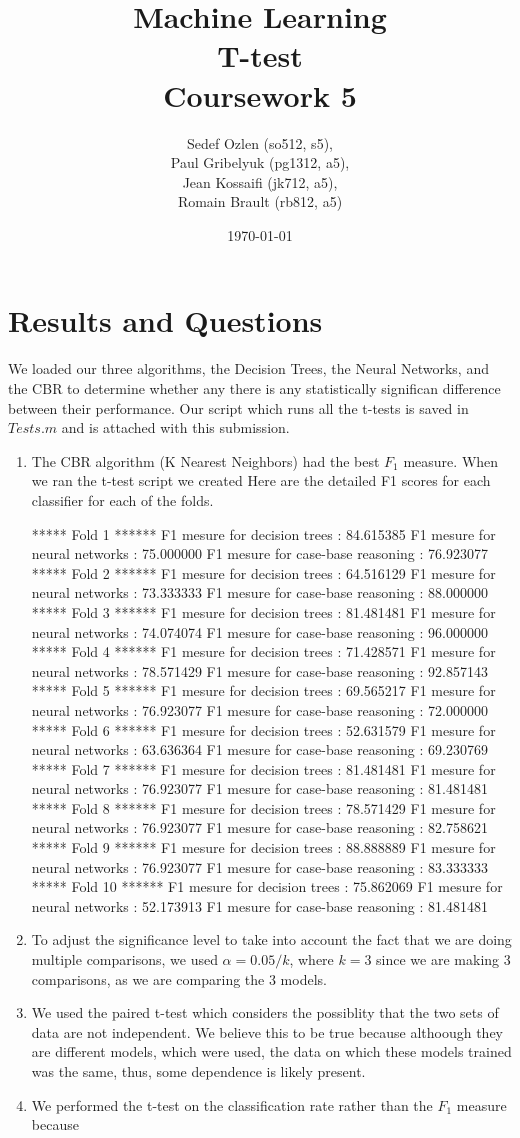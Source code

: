 \documentclass[a4paper,12pt,oneside,final]{report}
\author{
    Sedef Ozlen (so512, s5), \\ 
    Paul Gribelyuk (pg1312, a5), \\
    Jean Kossaifi (jk712, a5), \\ 
    Romain Brault (rb812, a5)
}
\title{\Huge Machine Learning \\ T-test \\ Coursework 5}
\date{\today}
\begin{document}
\maketitle
\tableofcontents
\listoffigures


\chapter{Results and Questions}
We loaded our three algorithms, the Decision Trees, the Neural Networks, and the CBR to determine whether any there is any statistically significan difference between their performance.  Our script which runs all the t-tests is saved in $Tests.m$ and is attached with this submission.
\begin{enumerate}
\item The CBR algorithm (K Nearest Neighbors) had the best $F_1$ measure.  When we ran the t-test script we created
Here are the detailed F1 scores for each classifier for each of the folds.

***** Fold 1 ******
F1 mesure for decision trees : 84.615385
F1 mesure for neural networks : 75.000000
F1 mesure for case-base reasoning : 76.923077
***** Fold 2 ******
F1 mesure for decision trees : 64.516129
F1 mesure for neural networks : 73.333333
F1 mesure for case-base reasoning : 88.000000
***** Fold 3 ******
F1 mesure for decision trees : 81.481481
F1 mesure for neural networks : 74.074074
F1 mesure for case-base reasoning : 96.000000
***** Fold 4 ******
F1 mesure for decision trees : 71.428571
F1 mesure for neural networks : 78.571429
F1 mesure for case-base reasoning : 92.857143
***** Fold 5 ******
F1 mesure for decision trees : 69.565217
F1 mesure for neural networks : 76.923077
F1 mesure for case-base reasoning : 72.000000
***** Fold 6 ******
F1 mesure for decision trees : 52.631579
F1 mesure for neural networks : 63.636364
F1 mesure for case-base reasoning : 69.230769
***** Fold 7 ******
F1 mesure for decision trees : 81.481481
F1 mesure for neural networks : 76.923077
F1 mesure for case-base reasoning : 81.481481
***** Fold 8 ******
F1 mesure for decision trees : 78.571429
F1 mesure for neural networks : 76.923077
F1 mesure for case-base reasoning : 82.758621
***** Fold 9 ******
F1 mesure for decision trees : 88.888889
F1 mesure for neural networks : 76.923077
F1 mesure for case-base reasoning : 83.333333
***** Fold 10 ******
F1 mesure for decision trees : 75.862069
F1 mesure for neural networks : 52.173913
F1 mesure for case-base reasoning : 81.481481
\item To adjust the significance level to take into account the fact that we are doing multiple comparisons, we used $\alpha = 0.05 / k$, where $k = 3$ since we are making 3 comparisons, as we are comparing the 3 models.
\item We used the paired t-test which considers the possiblity that the two sets of data are not independent.  We believe this to be true because althoough they are different models, which were used, the data on which these models trained was the same, thus, some dependence is likely present.
\item We performed the t-test on the classification rate rather than the $F_1$ measure because 
\end{enumerate}




\begin{appendices}

\end{appendices}
\end{document}
